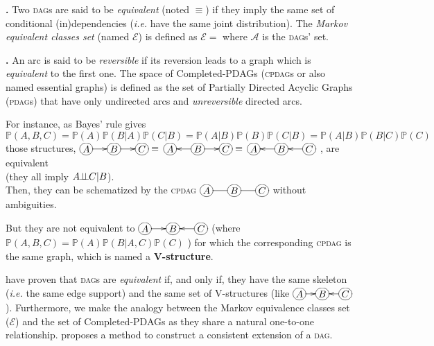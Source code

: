 \begin{de}\label{equim}\hspace*{-6pt}\textbf{.}
Two \textsc{dag}s are said to be \emph{equivalent} (noted $\equiv$) if they imply the same set of conditional (in)dependencies (\emph{i.e.} have the same joint distribution).
The \emph{Markov equivalent classes set} (named $\mathcal{E}$) is defined as $\mathcal{E} = $\Large{} \normalsize 
where $\mathcal{A}$ is the \textsc{dag}s' set.
\end{de}

\begin{de}\label{cpdag}\hspace*{-6pt}\textbf{.}
An arc is said to be \emph{reversible} if its reversion leads to a graph which is \emph{equivalent} to the first one.
The space of Completed-PDAGs (\textsc{cpdag}s or also named essential graphs) is defined as the set of Partially Directed Acyclic Graphs (\textsc{pdag}s) that have only undirected arcs and \emph{unreversible} directed arcs.
\end{de}

\noindent For instance, as Bayes' rule gives\\
\small $\mathbb{P}(A,B,C)=\mathbb{P}(A)\mathbb{P}(B|A)\mathbb{P}(C|B)=\mathbb{P}(A|B)\mathbb{P}(B)\mathbb{P}(C|B)=\mathbb{P}(A|B)\mathbb{P}(B|C)\mathbb{P}(C)$ \normalsize \\
those structures, 
\scriptsize $\xymatrix @C=15pt{*+[o][F]{A} \ar[r] & *+[o][F]{B} \ar[r] & *+[o][F]{C}}\equiv$
$\xymatrix @C=15pt{*+[o][F]{A} & *+[o][F]{B} \ar[l] \ar[r] & *+[o][F]{C}}\equiv$
$\xymatrix @C=15pt{*+[o][F]{A} & *+[o][F]{B} \ar[l] & *+[o][F]{C} \ar[l]}$ \normalsize 
, are equivalent \\(they all imply $A\!\!\perp\!\!\!\perp\!\! C|B$). \\
Then, they can be schematized by the \textsc{cpdag} 
\scriptsize $\xymatrix @C=15pt{*+[o][F]{A} \ar@{-}[r] & *+[o][F]{B} \ar@{-}[r] & *+[o][F]{C}}$ \normalsize without ambiguities.

\noindent But they are not equivalent to
\scriptsize $\xymatrix @C=15pt{*+[o][F]{A} \ar[r] & *+[o][F]{B} & *+[o][F]{C} \ar[l]}$ \normalsize
(where \small $\mathbb{P}(A,B,C)=\mathbb{P}(A)\mathbb{P}(B|A,C)\mathbb{P}(C)$ \normalsize )
for which the corresponding \textsc{cpdag} is the same graph, which is named a \textbf{V-structure}.

 \noindent\cite{Ver90} have proven that \textsc{dag}s are \emph{equivalent} if, and only if, they have the same skeleton (\emph{i.e.} the same edge support) and the same set of V-structures (like \scriptsize$\xymatrix@C=10pt{*+[o][F]{A}\ar[r] & *+[o][F]{B} & *+[o][F]{C}\ar[l]}$\normalsize).
Furthermore, we make the analogy between the Markov equivalence classes set ($\mathcal{E}$) and the set of Completed-PDAGs as they share a natural one-to-one relationship.
\cite{Dor92} proposes a method to construct a consistent extension of a \textsc{dag}.
\vspace*{-1\baselineskip}

